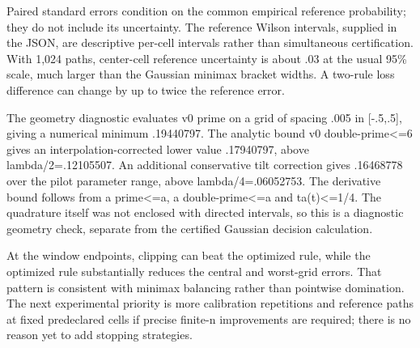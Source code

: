Paired standard errors condition on the common empirical reference
probability; they do not include its uncertainty. The reference Wilson
intervals, supplied in the JSON, are descriptive per-cell intervals
rather than simultaneous certification. With 1,024 paths, center-cell
reference uncertainty is about .03 at the usual 95\% scale, much larger
than the Gaussian minimax bracket widths. A two-rule loss difference can
change by up to twice the reference error.

The geometry diagnostic evaluates v0 prime on a grid of spacing .005 in
{[}-.5,.5{]}, giving a numerical minimum .19440797. The analytic bound
\textbar v0 double-prime\textbar\textless=6 gives an
interpolation-corrected lower value .17940797, above lambda/2=.12105507.
An additional conservative tilt correction gives .16468778 over the
pilot parameter range, above lambda/4=.06052753. The derivative bound
follows from \textbar a prime\textbar\textless=a, \textbar a
double-prime\textbar\textless=a and
\textbar t\textbar a(t)\textless=1/4. The quadrature itself was not
enclosed with directed intervals, so this is a diagnostic geometry
check, separate from the certified Gaussian decision calculation.

At the window endpoints, clipping can beat the optimized rule, while the
optimized rule substantially reduces the central and worst-grid errors.
That pattern is consistent with minimax balancing rather than pointwise
domination. The next experimental priority is more calibration
repetitions and reference paths at fixed predeclared cells if precise
finite-n improvements are required; there is no reason yet to add
stopping strategies.
